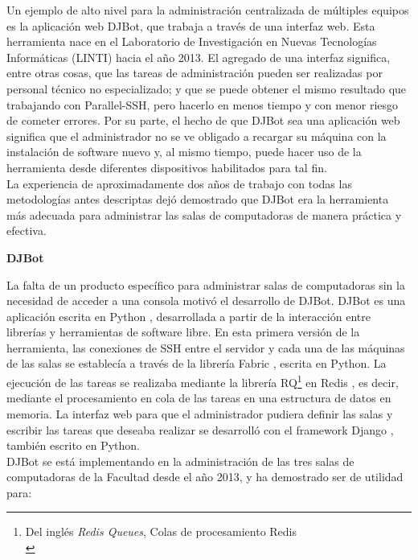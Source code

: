 \documentclass[a4paper,12pt]{article}
\begin{document}
Un ejemplo de alto nivel para la administración centralizada de múltiples equipos es la aplicación web DJBot, que trabaja a través de una interfaz web. Esta herramienta nace en el Laboratorio de Investigación en Nuevas Tecnologías Informáticas (LINTI) hacia el año 2013. El agregado de una interfaz significa, entre otras cosas, que las tareas de administración pueden ser realizadas por personal técnico no especializado; y que se puede obtener el mismo resultado que trabajando con Parallel-SSH, pero hacerlo en menos tiempo y con menor riesgo de cometer errores. Por su parte, el hecho de que DJBot sea una aplicación web significa que el administrador no se ve obligado a recargar su máquina con la instalación de software nuevo y, al mismo tiempo, puede hacer uso de la herramienta desde diferentes dispositivos habilitados para tal fin.\\

La experiencia de aproximadamente dos años de trabajo con todas las metodologías antes descriptas dejó demostrado que DJBot era la herramienta más adecuada para administrar las salas de computadoras de manera práctica y efectiva.\\

\item \textbf{DJBot}\\
\label{sec:orgheadline8}

La falta de un producto específico para administrar salas de computadoras sin la necesidad de acceder a una consola motivó el desarrollo de DJBot. DJBot es una aplicación escrita en Python \cite{Python}, desarrollada a partir de la interacción entre librerías y herramientas de software libre. En esta primera versión de la herramienta, las conexiones de SSH entre el servidor y cada una de las máquinas de las salas se establecía a través de la librería Fabric \cite{Fabric}, escrita en Python. La ejecución de las tareas se realizaba mediante la librería RQ\footnote{Del inglés \emph{Redis Queues}, Colas de procesamiento Redis\\} en Redis \cite{Redis}, es decir, mediante el procesamiento en cola de las tareas en una estructura de datos en memoria. La interfaz web para que el administrador pudiera definir las salas y escribir las tareas que deseaba realizar se desarrolló con el framework Django \cite{Django}, también escrito en Python.\\

DJBot se está implementando en la administración de las tres salas de computadoras de la Facultad desde el año 2013, y ha demostrado ser de utilidad para:\\
\end{document}
